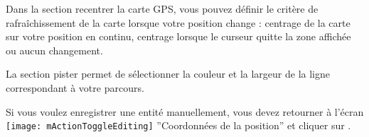 Dans la section recentrer la carte GPS, vous pouvez définir le critère de 
rafraîchissement de la carte lorsque votre position change : centrage de la 
carte sur votre position en continu, centrage lorsque le curseur quitte la 
zone affichée ou aucun changement. 

La section pister permet de sélectionner la couleur et la largeur de la ligne 
correspondant à votre parcours.

Si vous voulez enregistrer une entité manuellement, vous devez retourner à 
l'écran \texttt{[image: mActionToggleEditing]} ''Coordonnées 
de la position'' et cliquer sur . 

\FloatBarrier
